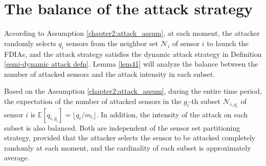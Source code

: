 \appendices
\section{The balance of the attack strategy}


According to Assumption \ref{chapter2:attack_assum}, at each moment, the attacker randomly selects $q_i$ sensors from the neighbor set $\mathcal{N}_i$ of sensor $i$ to launch the FDIAs, and the attack strategy satisfies the dynamic attack strategy in Definition \ref{semi-dynamic attack defn}.  Lemma \ref{lem41} will analyze the balance between the number of attacked sensors and the attack intensity in each subset.
\begin{lemma}\label{lem41}
    Based on the Assumption \ref{chapter2:attack_assum}, during the entire time period, the expectation of the number of attacked sensors in the $g_i$-th subset $\mathcal{N} _{i,g_i}$ of sensor $i$ is $\mathbb{E}[ q _{i,g_i}]= \lfloor q_i/m_i \rfloor$. In addition, the intensity of the attack on each subset is also balanced. Both are independent of the sensor set partitioning strategy, provided that the attacker selects the sensor to be attacked completely randomly at each moment, and the cardinality of each subset is approximately average.
\end{lemma}
